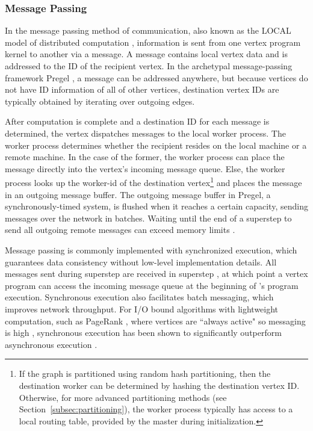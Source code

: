 \documentclass[reprint,twocolumn,showpacs,preprintnumbers,amsmath, aps,pre,amssymb]{revtex4-1}
\begin{document}
\subsubsection{Message Passing}
\label{subsubsec:msg}

In the message passing method of communication, also known as the LOCAL model of distributed computation \cite{Peleg}, information is sent from one vertex program kernel to another via a message. A message contains local vertex data and is addressed to the ID of the recipient vertex.  In the archetypal message-passing framework Pregel \cite{Malewicz2010}, a message can be addressed anywhere, but because vertices do not have ID information of all of other vertices, destination vertex IDs are typically obtained by iterating over outgoing edges.

After computation is complete and a destination ID for each message is determined, the vertex dispatches messages to the local worker process.  The worker process determines whether the recipient resides on the local machine or a remote machine.  In the case of the former, the worker process can place the message directly into the vertex's incoming message queue.  Else, the worker process looks up the worker-id of the destination vertex\footnote{If the graph is partitioned using random hash partitioning, then the destination worker can be determined by hashing the destination vertex ID.  Otherwise, for more advanced partitioning methods (see Section~\ref{subsec:partitioning}), the worker process typically has access to a local routing table, provided by the master during initialization.} and places the message in an outgoing message buffer.  The outgoing message buffer in Pregel, a synchronously-timed system, is flushed when it reaches a certain capacity, sending messages over the network in batches. Waiting until the end of a superstep to send all outgoing remote messages can exceed memory limits \cite{Satish}.

Message passing is commonly implemented with synchronized execution, which guarantees data consistency without low-level implementation details.  All messages sent during superstep  are received in superstep , at which point a vertex program can access the incoming message queue at the beginning of 's program execution.  Synchronous execution also facilitates batch messaging, which improves network throughput.  For I/O bound algorithms with lightweight computation, such as PageRank \cite{Brin1998}, where vertices are ``always active" so messaging is high \cite{Shang2013}, synchronous execution has been shown to significantly outperform asynchronous execution \cite{Xie2013}.
\end{document}
